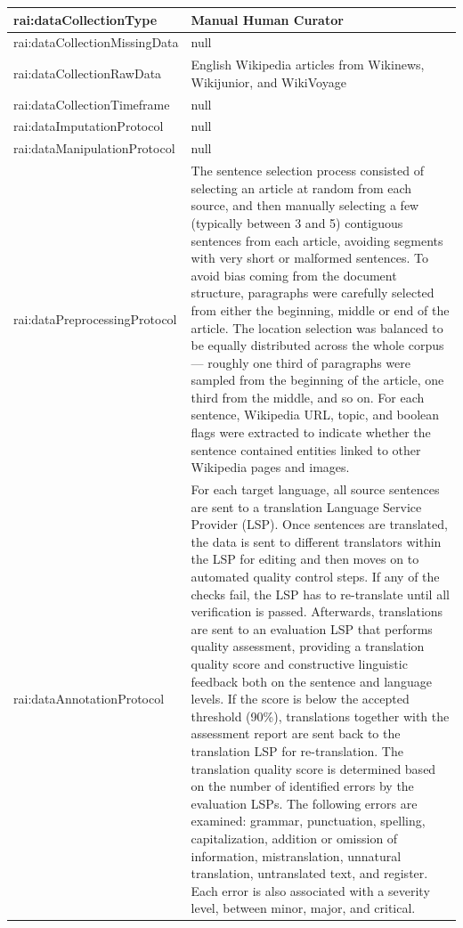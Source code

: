 \documentclass[10pt,a4paper]{article}
\begin{document}
\begin{longtable}{|p{4cm}|p{12cm}|}
\hline
rai:dataCollectionType & Manual Human Curator \\
\hline
rai:dataCollectionMissingData & null \\
\hline
rai:dataCollectionRawData & English Wikipedia articles from Wikinews, Wikijunior, and WikiVoyage \\
\hline
rai:dataCollectionTimeframe & null \\
\hline
rai:dataImputationProtocol & null \\
\hline
rai:dataManipulationProtocol & null \\
\hline
rai:dataPreprocessingProtocol & The sentence selection process consisted of selecting an article at random from each source, and then manually selecting a few (typically between 3 and 5) contiguous sentences from each article, avoiding segments with very short or malformed sentences. To avoid bias coming from the document structure, paragraphs were carefully selected from either the beginning, middle or end of the article. The location selection was balanced to be equally distributed across the whole corpus --- roughly one third of paragraphs were sampled from the beginning of the article, one third from the middle, and so on. For each sentence, Wikipedia URL, topic, and boolean flags were extracted to indicate whether the sentence contained entities linked to other Wikipedia pages and images. \\
\hline
rai:dataAnnotationProtocol & For each target language, all source sentences are sent to a translation Language Service Provider (LSP). Once sentences are translated, the data is sent to different translators within the LSP for editing and then moves on to automated quality control steps. If any of the checks fail, the LSP has to re-translate until all verification is passed. Afterwards, translations are sent to an evaluation LSP that performs quality assessment, providing a translation quality score and constructive linguistic feedback both on the sentence and language levels. If the score is below the accepted threshold (90\%), translations together with the assessment report are sent back to the translation LSP for re-translation. The translation quality score is determined based on the number of identified errors by the evaluation LSPs. The following errors are examined: grammar, punctuation, spelling, capitalization, addition or omission of information, mistranslation, unnatural translation, untranslated text, and register. Each error is also associated with a severity level, between minor, major, and critical. \\

\end{longtable}
\end{document}
